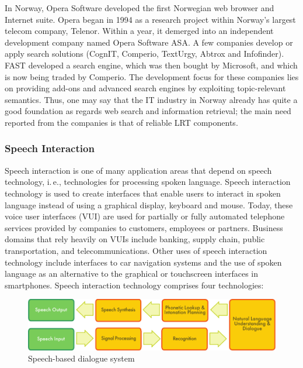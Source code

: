 \begin{multicols}{2}
In Norway, Opera Software developed the first Norwegian web browser and Internet suite.
Opera began in 1994 as a research project within Norway’s largest telecom company, Telenor. 
Within a year, it demerged into an independent development company named Opera Software ASA.
A few companies develop or apply search solutions (CognIT, Comperio, TextUrgy, Abtrox and Infofinder). 
FAST developed a search engine, which was then bought by Microsoft, and which is now being traded by Comperio. 
The development focus for these companies lies on providing add-ons and advanced search engines by exploiting topic-relevant semantics. 
Thus, one may say that the IT industry in Norway already has quite a good foundation as regards web search and information retrieval; the main need reported from the companies is that of reliable LRT components.

\subsubsection{Speech Interaction}

Speech interaction is one of many application areas that depend on speech technology, i.\,e., technologies for processing spoken language. Speech interaction technology is used to create interfaces that enable users to interact in spoken language instead of using a graphical display, keyboard and mouse.  Today, these voice user interfaces (VUI) are used for partially or fully automated telephone services provided by companies to customers, employees or partners. Business domains that rely heavily on VUIs include banking, supply chain, public transportation, and telecommunications. Other uses of speech interaction technology include interfaces to car navigation systems and the use of spoken language as an alternative to the graphical or touchscreen interfaces in smartphones. 
Speech interaction technology comprises four technologies: 

\begin{figure}[htb]
  \center
  \includegraphics[width=\textwidth]{../_media/english/simple_speech-based_dialogue_architecture}
  \caption{Speech-based dialogue system}
\label{fig:dialoguearch_en}
\end{figure}


\end{multicols}
